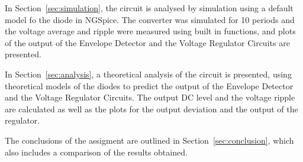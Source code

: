 In Section~\ref{sec:simulation}, the circuit is analysed by simulation using a default model fo the diode in NGSpice. The converter was simulated for 10 periods and the voltage average and ripple were measured using built in functions, and plots of the output of the Envelope Detector and the Voltage Regulator Circuits are presented.\par
In Section~\ref{sec:analysis}, a theoretical analysis of the circuit is presented, using theoretical models of the diodes to predict the output of the Envelope Detector and the Voltage Regulator Circuits. The output DC level and the voltage ripple are calculated as well as the plots for the output deviation and the output of the regulator.\par
The conclusions of the assigment are outlined in  Section~\ref{sec:conclusion}, which also includes a comparison of the results obtained.
